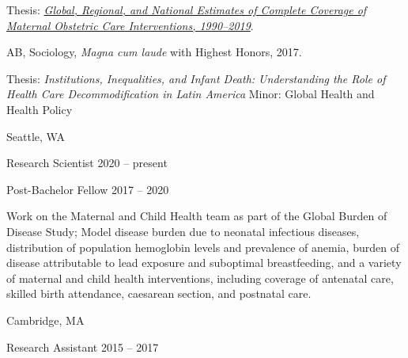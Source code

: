 \documentclass[11pt,article,oneside]{memoir}
\begin{document}
\ind \hspace{0.35in} \footnotesize Thesis: \href{https://www.proquest.com/openview/e41ccfd9cef6b7376c1218dc0080b575/1?pq-origsite=gscholar&cbl=18750&diss=y}{\emph{Global, Regional, and National Estimates of Complete Coverage of Maternal \newline Obstetric Care
	Interventions, 1990--2019}}.\normalsize 

\medskip
{}

\ind AB, Sociology, \emph{Magna cum laude} with Highest Honors, 2017.

\ind \hspace{0.35in} \footnotesize Thesis: \emph{Institutions, Inequalities, and Infant Death: Understanding the Role of Health Care \newline
Decommodification in Latin America} \newline Minor: Global Health and Health Policy \normalsize \vspace{0.01in}

\bigskip


 \hfill Seattle, WA

\ind Research Scientist \hfill 2020 -- present

\ind Post-Bachelor Fellow\vspace{0.02in} \hfill 2017 -- 2020

{\noindent \footnotesize Work on the Maternal and Child Health team as part of the Global Burden of Disease Study; Model disease
burden due to neonatal infectious diseases, distribution of population hemoglobin levels and prevalence of
anemia, burden of disease attributable to lead exposure and suboptimal breastfeeding, and a variety of
maternal and child health interventions, including coverage of antenatal care, skilled birth attendance,
caesarean section, and postnatal care.}

\bigskip

 \hfill Cambridge, MA

\ind Research Assistant\vspace{0.02in} \hfill 2015 -- 2017
\end{document}
